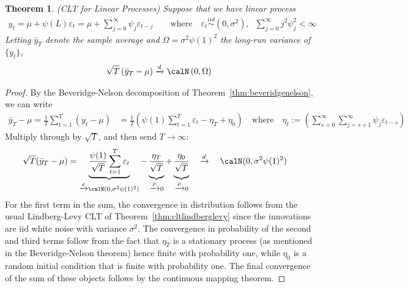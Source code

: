 \documentclass[12pt]{article}
\theoremstyle{plain}
\newtheorem{thm}{Theorem}[section]
\theoremstyle{definition}
\theoremstyle{remark}
\newcommand{\ra}{\rightarrow}
\newcommand{\iid}{\overset{iid}{\sim}}
\newcommand{\pto}{\xrightarrow{P}}
\newcommand{\dto}{\xrightarrow{d}}
\newcommand{\sumtT}{\sum^T_{t=1}}
\begin{document}
\begin{thm}
\label{thm:cltlinear}
\emph{(CLT for Linear Processes)}
Suppose that we have linear process
\begin{align*}
  y_t
  = \mu + \psi(L) \varepsilon_t
  =\mu+\sum_{j=0}^\infty \psi_j \varepsilon_{t-j}
  \qquad\text{where}\quad
  \varepsilon_t\iid (0,\sigma^2),\;\;
  \sum_{j=0}^\infty j^2\psi_j^2<\infty
\end{align*}
Letting $\bar{y}_T$ denote the sample average and
$\Omega=\sigma^2\psi(1)^2$ the long-run variance of $\{y_t\}$,
\begin{align*}
  \sqrt{T}\left(
  \bar{y}_T
  - \mu
  \right)
  \dto \calN\left(0,\Omega\right)
\end{align*}
\end{thm}
\begin{proof}
By the Beveridge-Nelson decomposition of
Theorem~\ref{thm:beveridgenelson}, we can write
\begin{align*}
  \bar{y}_T-\mu
  =
  \frac{1}{T}\sumtT (y_t-\mu)
  &=
  \frac{1}{T}
  \left(
  \psi(1)
  \sumtT \varepsilon_t
  -
  \eta_T
  +
  \eta_0
  \right)
  \quad \text{where}\quad
  \eta_t
  :=
  \left(
  \sum_{s=0}^\infty
  \sum_{j=s+1}^\infty \psi_j\varepsilon_{t-s}
  \right)
\end{align*}
Multiply through by $\sqrt{T}$, and then send $T\ra\infty$:
\begin{align*}
  \sqrt{T}(\bar{y}_T-\mu)
  &=
  \underbrace{%
    \frac{\psi(1)}{\sqrt{T}}
    \sumtT \varepsilon_t
  }_{\dto \calN(0,\sigma^2\psi(1)^2)}
  -
  \underbrace{%
    \frac{\eta_T}{\sqrt{T}}
    \vphantom{%
      \frac{\psi(1)}{\sqrt{T}}
      \sumtT \varepsilon_t
    }
  }_{\pto 0}
  +
  \underbrace{%
    \frac{\eta_0}{\sqrt{T}}
    \vphantom{%
      \frac{\psi(1)}{\sqrt{T}}
      \sumtT \varepsilon_t
    }
  }_{\pto 0}
  \quad
  \dto
  \quad
  \calN(0,\sigma^2\psi(1)^2)
\end{align*}
For the first term in the sum, the convergence in distribution follows
from the usual Lindberg-Levy CLT of Theorem~\ref{thm:cltlindberglevy}
since the innovations are iid white noise with variance $\sigma^2$.
The convergence in probability of the second and third terms follow from
the fact that $\eta_T$ is a stationary process (as mentioned in the
Beveridge-Nelson theorem) hence finite with probability one, while
$\eta_0$ is a random initial condition that is finite with probability
one.
The final convergence of the sum of these objects follows by the
continuous mapping theorem.
\end{proof}
\end{document}
